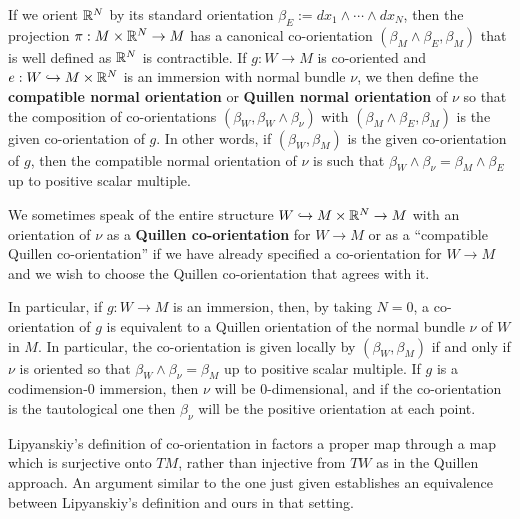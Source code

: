 \begin{definition}\label{D: Quillen normal or}
	If we orient $\mathbb{R}^N$ by its standard orientation $\beta_E:= dx_1\wedge\cdots\wedge dx_N$, then the projection $\pi:M\times \mathbb{R}^N\to M$ has a canonical co-orientation $(\beta_M\wedge \beta_E,\beta_M)$ that is well defined as $\mathbb{R}^N$ is contractible.
	If $g \colon W \to M$ is co-oriented and $e:W\hookrightarrow M\times \mathbb{R}^N$ is an immersion with normal bundle $\nu$, we then define the \textbf{compatible normal orientation} or \textbf{Quillen normal orientation} of $\nu$ so that the composition of co-orientations $(\beta_W,\beta_W\wedge \beta_\nu)$ with $(\beta_M\wedge \beta_E,\beta_M)$ is the given co-orientation of $g$.
	In other words, if $(\beta_W,\beta_M)$ is the given co-orientation of $g$, then the compatible normal orientation of $\nu$ is such that $\beta_W\wedge \beta_\nu=
	\beta_M\wedge \beta_E$ up to positive scalar multiple.

	We sometimes speak of the entire structure $W\hookrightarrow M\times \mathbb{R}^N\to M$ with an orientation of $\nu$ as a \textbf{Quillen co-orientation} for $W\to M$ or as a ``compatible Quillen co-orientation'' if we have already specified a co-orientation for $W\to M$ and we wish to choose the Quillen co-orientation that agrees with it.
\end{definition}

\begin{remark}\label{R: immersion}
	In particular, if $g: W\to M$ is an immersion, then, by taking $N=0$, a co-orientation of $g$ is equivalent to a Quillen orientation of the normal bundle
	$\nu$ of $W$ in $M$.
	In particular, the co-orientation is given locally by $(\beta_W,\beta_M)$ if and only if $\nu$ is oriented so that $\beta_W\wedge \beta_\nu=
	\beta_M$ up to positive scalar multiple.
	If $g$ is a codimension-$0$ immersion, then $\nu$ will be $0$-dimensional, and if the co-orientation is the tautological one then $\beta_\nu$ will be the positive orientation at each point.
\end{remark}

\begin{remark}
	Lipyanskiy's definition of co-orientation in \cite{Lipy14} factors a proper map through a map which is surjective onto $TM$,
	rather than injective from $TW$ as in the Quillen approach.
	An argument similar to the one just given establishes an equivalence between Lipyanskiy's definition and ours in that setting.
\end{remark}

